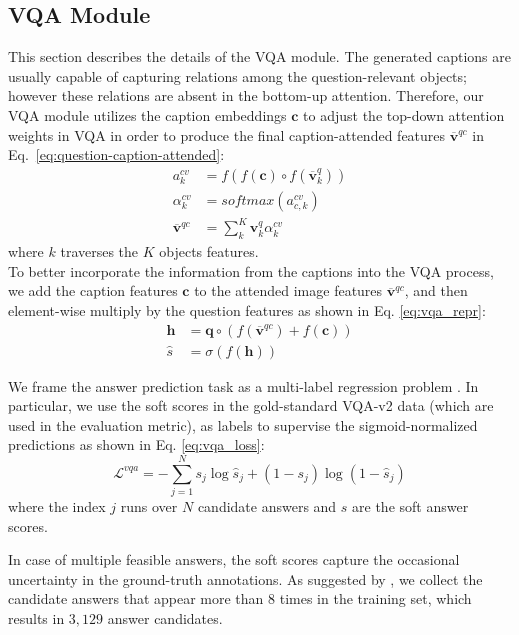 \documentclass[11pt,a4paper]{article}
\begin{document}
\subsection{VQA Module}
\label{sec:vqa}
This section describes the details of the VQA module. The generated captions are usually capable of capturing relations among the question-relevant objects; however these relations are absent in the bottom-up attention. Therefore, our VQA module utilizes the caption embeddings $\textbf{c}$ to adjust the top-down attention weights in VQA in order to produce the final caption-attended features $\overline{\textbf{v}}^{qc}$ in Eq.\ \ref{eq:question-caption-attended}:
\begin{align}
    a^{cv}_{k} &= f(f(\textbf{c})\circ f(\overline{\textbf{v}}^q_k))\\
    \label{eq:image_caption_attention}
    \alpha^{cv}_{k} &=  softmax(a^{cv}_{c,k})\\
    \label{eq:question-caption-attended}
    \overline{\textbf{v}}^{qc} &=  \sum_{k}^{K}  \textbf{v}^{q}_{k} \alpha^{cv}_{k}
\end{align}
where $k$ traverses the $K$ objects features.\\
To better incorporate the information from the captions into the VQA process, we add the caption features $\textbf{c}$ to the attended image features $\overline{\textbf{v}}^{qc}$, and then element-wise multiply by the question features as shown in Eq. \ref{eq:vqa_repr}:
\begin{align}
\label{eq:vqa_repr}
    \textbf{h} &= \textbf{q} \circ (f(\overline{\textbf{v}}^{qc}) + f(\textbf{c}))\\
    \hat{s} &= \sigma(f(\textbf{h}))
\end{align}

We frame the answer prediction task as a multi-label regression problem \cite{anderson2017bottom}. In particular, we use the soft scores in the gold-standard VQA-v2 data (which are used in the evaluation metric), as labels to supervise the sigmoid-normalized predictions as shown in Eq. \ref{eq:vqa_loss}:
\begin{equation}
\label{eq:vqa_loss}
    \mathcal{L}^{vqa} = -\sum^N_{j=1} s_{j}\log\hat{s}_{j} + (1-s_{j})\log(1-\hat{s}_{j})
\end{equation}
where the index $j$ runs  over 
$N$ candidate answers and $s$ are the soft answer scores.

In case of multiple feasible answers, the soft scores capture the occasional uncertainty in the ground-truth annotations. As suggested by , we collect the candidate answers that appear more than $8$ times in the training set, which results in $3,129$ answer candidates. 
\end{document}
